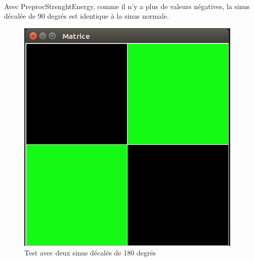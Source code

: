 \paragraph{}
Avec PreprocStrenghtEnergy, comme il n'y a plus de valeurs négatives, la sinus décalée de 90 degrés est identique à la sinus normale.
\begin{figure}[H]
    \centering
    \includegraphics[scale=0.3]{assets/Captures-sinus/PreprocStrenghtnormal-180.png}
    \caption{Test avec deux sinus décalés de 180 degrés}
    \label{}
\end{figure}